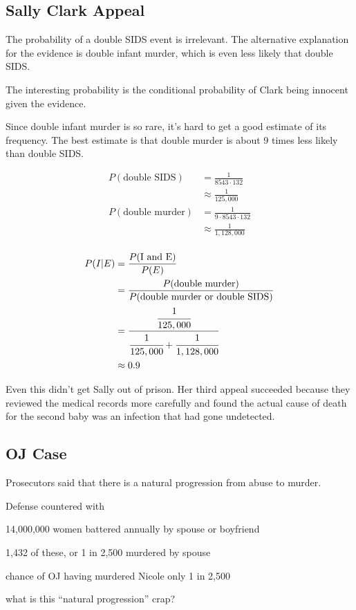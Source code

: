\documentclass[landscape]{exam}
\begin{document}
  \subsection{Sally Clark Appeal}
  The probability of a double SIDS event is irrelevant. The alternative
  explanation for the evidence is double infant murder, which is even less
  likely that double SIDS. 
  
  The interesting probability is the conditional probability of Clark being
  innocent given the evidence.

  Since double infant murder is so rare, it's hard to get a good estimate of its
  frequency. The best estimate is that double murder is about 9 times less
  likely than double SIDS.

  \begin{align*}
    P(\text{double SIDS}) & = \frac{1}{8543 \cdot 132} \\
                            & \approx \frac{1}{125,000} \\
    P(\text{double murder}) & = \frac{1}{9 \cdot 8543 \cdot 132} \\
                            & \approx \frac{1}{1,128,000} \\
  \end{align*}

  \begin{align*}
    P(I | E) & = \frac{P(\text{I and E})}{P(E)} \\
             & = \frac{P(\text{double murder})}{P(\text{double murder or double SIDS})} \\
             & = \frac{\cfrac{1}{125,000}}{\cfrac{1}{125,000} + \cfrac{1}{1,128,000}} \\
             & \approx 0.9 \\
  \end{align*}

  Even this didn't get Sally out of prison. Her third appeal succeeded because
  they reviewed the medical records more carefully and found the actual cause of
  death for the second baby was an infection that had gone undetected.

  \subsection{OJ Case}
  Prosecutors said that there is a natural progression from abuse to murder.

  Defense countered with 
  \begin{itemize*}
    \item 14,000,000 women battered annually by spouse or boyfriend
    \item 1,432 of these, or 1 in 2,500 murdered by spouse
    \item chance of OJ having murdered Nicole only 1 in 2,500
    \item what is this ``natural progression'' crap?
  \end{itemize*}
\end{document}
